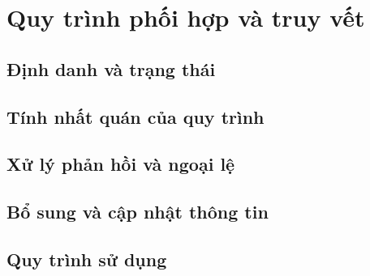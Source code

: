 \par{}
\section{Quy trình phối hợp và truy vết}\label{section:synchronization-1}

\par{}
\subsection{Định danh và trạng thái}\label{subsection:synchronization-2}

\par{}
\subsection{Tính nhất quán của quy trình}\label{subsection:synchronization-3}

\par{}
\subsection{Xử lý phản hồi và ngoại lệ}\label{subsection:synchronization-4}

\par{}
\subsection{Bổ sung và cập nhật thông tin}\label{subsection:synchronization-5}

\par{}
\subsection{Quy trình sử dụng}\label{subsection:synchronization-6}

